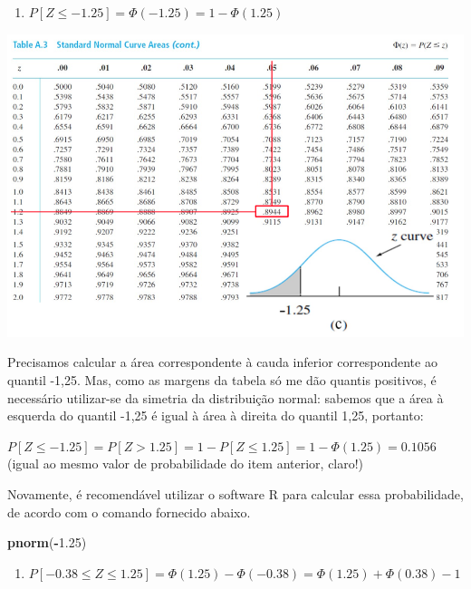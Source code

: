 \documentclass[
]{book}
\newenvironment{Shaded}{\begin{snugshade}}{\end{snugshade}}
\newcommand{\FloatTok}[1]{\textcolor[rgb]{0.00,0.00,0.81}{#1}}
\newcommand{\KeywordTok}[1]{\textcolor[rgb]{0.13,0.29,0.53}{\textbf{#1}}}
\newcommand{\NormalTok}[1]{#1}
\newcommand{\OperatorTok}[1]{\textcolor[rgb]{0.81,0.36,0.00}{\textbf{#1}}}
\providecommand{\tightlist}{%
  \setlength{\itemsep}{0pt}\setlength{\parskip}{0pt}}
\theoremstyle{definition}
\theoremstyle{definition}
\theoremstyle{definition}
\theoremstyle{remark}
\begin{document}
\begin{enumerate}
\def\labelenumi{(\alph{enumi})}
\setcounter{enumi}{2}
\tightlist
\item
  \(P[Z \leq - 1.25] = \Phi(-1.25) = 1 - \Phi(1.25)\)
\end{enumerate}

\includegraphics[width=1\linewidth]{img/distr-normal-c}

Precisamos calcular a área correspondente à cauda inferior correspondente ao quantil -1,25. Mas, como as margens da tabela só me dão quantis positivos, é necessário utilizar-se da simetria da distribuição normal: sabemos que a área à esquerda do quantil -1,25 é igual à área à direita do quantil 1,25, portanto:

\(P[Z ≤ -1.25] = P[Z > 1.25] = 1 - P[Z ≤ 1.25] = 1 - \Phi(1.25) = 0.1056\)
(igual ao mesmo valor de probabilidade do item anterior, claro!)

Novamente, é recomendável utilizar o software R para calcular essa probabilidade, de acordo com o comando fornecido abaixo.

\begin{Shaded}
\begin{Highlighting}[]
\KeywordTok{pnorm}\NormalTok{(}\OperatorTok{-}\FloatTok{1.25}\NormalTok{)}
\end{Highlighting}
\end{Shaded}

\begin{enumerate}
\def\labelenumi{(\alph{enumi})}
\setcounter{enumi}{3}
\tightlist
\item
  \(P[-0.38 \leq Z \leq 1.25] = \Phi(1.25) - \Phi(-0.38) = \Phi(1.25) + \Phi(0.38) - 1\)
\end{enumerate}
\end{document}
